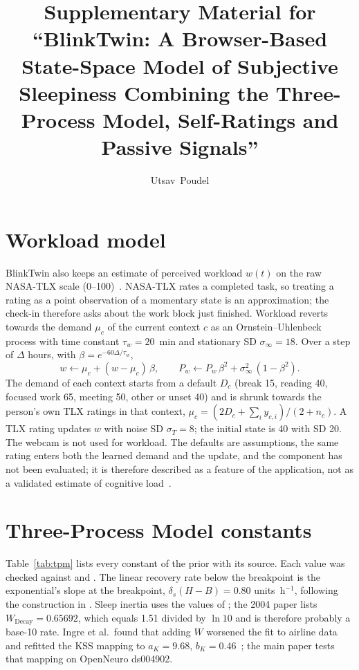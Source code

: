 \documentclass[journal]{IEEEtran}
\begin{document}
\title{Supplementary Material for ``BlinkTwin: A Browser-Based State-Space Model of Subjective Sleepiness Combining the Three-Process Model, Self-Ratings and Passive Signals''}
\author{Utsav~Poudel}
\maketitle

\section{Workload model}
\label{sec:workload}
BlinkTwin also keeps an estimate of perceived workload $w(t)$ on the raw NASA-TLX scale (0--100)~\cite{hart1988development,hart2006nasa}. NASA-TLX rates a completed task, so treating a rating as a point observation of a momentary state is an approximation; the check-in therefore asks about the work block just finished. Workload reverts towards the demand $\mu_c$ of the current context $c$ as an Ornstein--Uhlenbeck process with time constant $\tau_w = 20$~min and stationary SD $\sigma_\infty = 18$. Over a step of $\Delta$ hours, with $\beta = e^{-60\Delta/\tau_w}$,
\begin{equation}
  w \leftarrow \mu_c + (w - \mu_c)\,\beta, \qquad P_w \leftarrow P_w\,\beta^2 + \sigma_\infty^2\,(1 - \beta^2).
\end{equation}
The demand of each context starts from a default $D_c$ (break 15, reading 40, focused work 65, meeting 50, other or unset 40) and is shrunk towards the person's own TLX ratings in that context, $\mu_c = (2D_c + \sum_i y_{c,i})/(2 + n_c)$. A TLX rating updates $w$ with noise SD $\sigma_T = 8$; the initial state is 40 with SD 20. The webcam is not used for workload. The defaults are assumptions, the same rating enters both the learned demand and the update, and the component has not been evaluated; it is therefore described as a feature of the application, not as a validated estimate of cognitive load~\cite{paas2003cognitive}.

\section{Three-Process Model constants}
\label{sec:tpm}
Table~\ref{tab:tpm} lists every constant of the prior with its source. Each value was checked against \cite{akerstedt2004predictions} and \cite{ingre2014validating}. The linear recovery rate below the breakpoint is the exponential's slope at the breakpoint, $\delta_s(H - B) = 0.80$ units~h$^{-1}$, following the construction in \cite{akerstedt2004predictions}. Sleep inertia uses the values of \cite{ingre2014validating}; the 2004 paper lists $W_{\mathrm{Decay}} = 0.65692$, which equals 1.51 divided by $\ln 10$ and is therefore probably a base-10 rate. Ingre et al.\ found that adding $W$ worsened the fit to airline data and refitted the KSS mapping to $a_K = 9.68$, $b_K = 0.46$~\cite{ingre2014validating}; the main paper tests that mapping on OpenNeuro ds004902.
\end{document}
